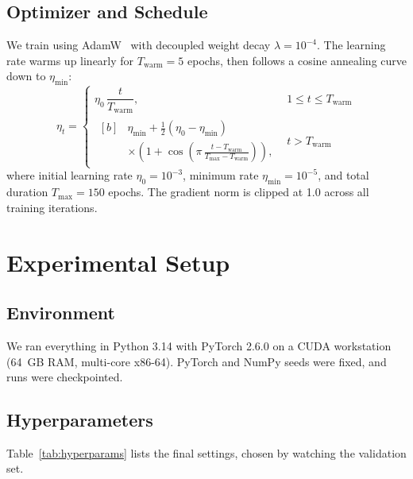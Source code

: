 \documentclass[conference,10pt,letterpaper]{IEEEtran}
\begin{document}
\subsection{Optimizer and Schedule}
We train using AdamW~\cite{loshchilov2017decoupled} with decoupled weight decay $\lambda = 10^{-4}$. The learning rate warms up linearly for $T_{\text{warm}} = 5$ epochs, then follows a cosine annealing curve down to $\eta_{\min}$:
\begin{equation}
\eta_t = \begin{cases}
\eta_0 \,\dfrac{t}{T_{\text{warm}}}, & 1 \le t \le T_{\text{warm}} \\[6pt]
\begin{aligned}[b]
&\eta_{\min} + \tfrac{1}{2}(\eta_0 - \eta_{\min}) \\
&\times \left(1 + \cos\!\left(\pi\,\tfrac{t - T_{\text{warm}}}{T_{\max} - T_{\text{warm}}}\right)\right),
\end{aligned} & t > T_{\text{warm}}
\end{cases}
\end{equation}
where initial learning rate $\eta_0 = 10^{-3}$, minimum rate $\eta_{\min} = 10^{-5}$, and total duration $T_{\max} = 150$ epochs. The gradient norm is clipped at 1.0 across all training iterations.

\section{Experimental Setup}

\subsection{Environment}
We ran everything in Python 3.14 with PyTorch 2.6.0 on a CUDA workstation (64~GB RAM, multi-core x86-64). PyTorch and NumPy seeds were fixed, and runs were checkpointed.

\subsection{Hyperparameters}
Table~\ref{tab:hyperparams} lists the final settings, chosen by watching the validation set.
\end{document}
